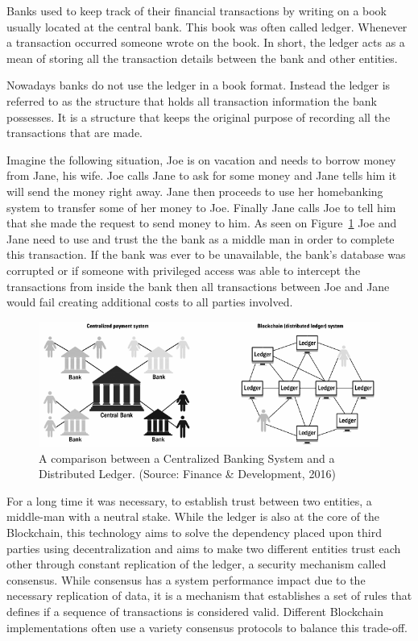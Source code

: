 Banks used to keep track of their financial transactions by writing on a book
usually located at the central bank. This book was often called ledger.
Whenever a transaction occurred someone wrote on the book. In short, the ledger
acts as a mean of storing all the transaction details between the bank and
other entities. 

Nowadays banks do not use the ledger in a book format. Instead the ledger is
referred to as the structure that holds all transaction information the bank
possesses. It is a structure that keeps the original purpose of recording all
the transactions that are made.

Imagine the following situation, Joe is on vacation and needs to borrow money
from Jane, his wife. Joe calls Jane to ask for some money and Jane tells him it
will send the money right away. Jane then proceeds to use her homebanking
system to transfer some of her money to Joe. Finally Jane calls Joe to tell him
that she made the request to send money to him.  As seen on
Figure~\ref{fig:centralizedvsdescentralized} Joe and Jane need to use and trust
the the bank as a middle man in order to complete this transaction. If the bank
was ever to be unavailable, the bank's database was corrupted or if someone
with  privileged access was able to intercept the transactions from inside the
bank then all transactions between Joe and Jane would fail creating additional
costs to all parties involved. 

\begin{figure}[h]
  \centering
  \includegraphics[width=1\linewidth]{imgs/blockchainvscentralizedNetwork.png}
  \caption{\label{fig:centralizedvsdescentralized} A comparison between a
  Centralized Banking System and a Distributed Ledger. (Source: Finance \&
  Development, 2016)}
\end{figure}

For a long time it was necessary, to establish trust between two entities, a
middle-man with a neutral stake. While the ledger is also at the core of the
Blockchain, this technology aims to solve the dependency placed upon third
parties using decentralization and aims to make two different entities trust
each other through constant replication of the ledger, a security mechanism
called consensus.  While consensus has a system performance impact due to the
necessary replication of data, it is a mechanism that establishes a set of
rules that defines if a sequence of transactions is considered valid.
Different Blockchain implementations often use a variety consensus protocols to
balance this trade-off.

